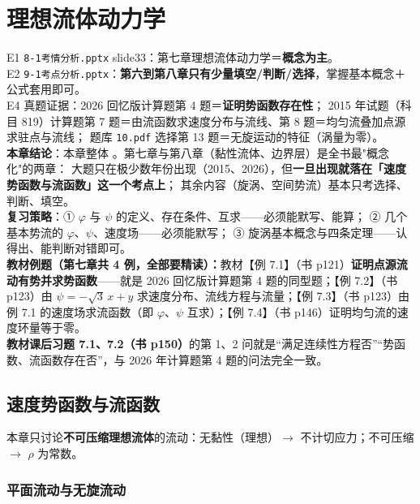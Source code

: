 \chapter{理想流体动力学}

\begin{yijubox}
E1 \texttt{8-1考情分析.pptx} slide33：第七章理想流体动力学＝\textbf{概念为主}。\\
E2 \texttt{9-1考点分析.pptx}：\textbf{第六到第八章只有少量填空/判断/选择}，掌握基本概念＋公式套用即可。\\
E4 真题证据：2026 回忆版计算题第 4 题＝\textbf{证明势函数存在性}；
2015 年试题（科目 819）计算题第 7 题＝由流函数求速度分布与流线、第 8 题＝均匀流叠加点源求驻点与流线；
题库 \texttt{10.pdf} 选择第 13 题＝无旋运动的特征（涡量为零）。\\
\textbf{本章结论}：本章整体 。第七章与第八章（黏性流体、边界层）是全书最"概念化"的两章：
大题只在极少数年份出现（2015、2026），但\textbf{一旦出现就落在「速度势函数与流函数」这一个考点上}；
其余内容（旋涡、空间势流）基本只考选择、判断、填空。\\
\textbf{复习策略}：① $\varphi$ 与 $\psi$ 的定义、存在条件、互求——必须能默写、能算；
② 几个基本势流的 $\varphi$、$\psi$、速度场——必须能默写；
③ 旋涡基本概念与四条定理——认得出、能判断对错即可。\\

\textbf{教材例题（第七章共 4 例，全部要精读）：}教材【例 7.1】（书 p121）\textbf{证明点源流动有势并求势函数}——就是 2026 回忆版计算题第 4 题的同型题；【例 7.2】（书 p123）由 $\psi=-\sqrt{3}\,x+y$ 求速度分布、流线方程与流量；【例 7.3】（书 p123）由例 7.1 的速度场求流函数（即 $\varphi$、$\psi$ 互求）；【例 7.4】（书 p146）证明均匀流的速度环量等于零。\\
\textbf{教材课后习题 7.1、7.2（书 p150）}的第 1、2 问就是“满足连续性方程否”“势函数、流函数存在否”，与 2026 年计算题第 4 题的问法完全一致。\\
\end{yijubox}

\section{速度势函数与流函数}

本章只讨论\textbf{不可压缩理想流体}的流动：无黏性（理想）$\to$ 不计切应力；不可压缩 $\to$ $\rho$ 为常数。

\subsection{平面流动与无旋流动}


